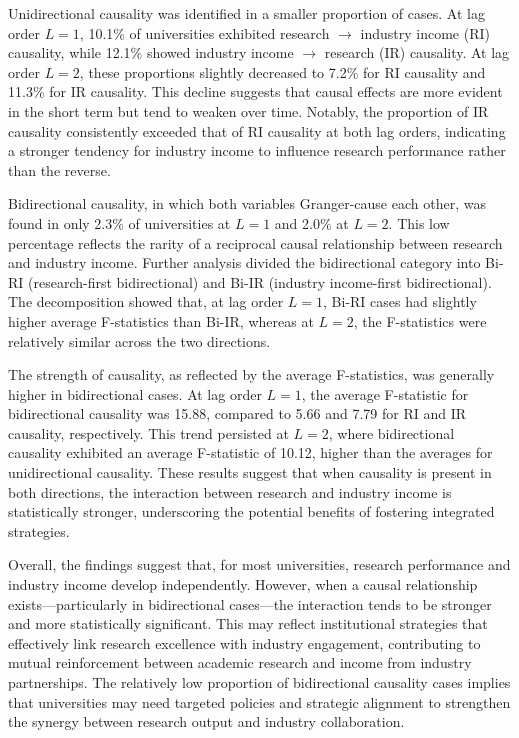 \documentclass[a4paper, conference]{IEEEtran}
\begin{document}
Unidirectional causality was identified in a smaller proportion of cases. At lag order $L=1$, 10.1\% of universities exhibited research $\rightarrow$ industry income (RI) causality, while 12.1\% showed industry income $\rightarrow$ research (IR) causality. At lag order $L=2$, these proportions slightly decreased to 7.2\% for RI causality and 11.3\% for IR causality. This decline suggests that causal effects are more evident in the short term but tend to weaken over time. Notably, the proportion of IR causality consistently exceeded that of RI causality at both lag orders, indicating a stronger tendency for industry income to influence research performance rather than the reverse.

Bidirectional causality, in which both variables Granger-cause each other, was found in only 2.3\% of universities at $L=1$ and 2.0\% at $L=2$. This low percentage reflects the rarity of a reciprocal causal relationship between research and industry income. Further analysis divided the bidirectional category into Bi-RI (research-first bidirectional) and Bi-IR (industry income-first bidirectional). The decomposition showed that, at lag order $L=1$, Bi-RI cases had slightly higher average F-statistics than Bi-IR, whereas at $L=2$, the F-statistics were relatively similar across the two directions.

The strength of causality, as reflected by the average F-statistics, was generally higher in bidirectional cases. At lag order $L=1$, the average F-statistic for bidirectional causality was 15.88, compared to 5.66 and 7.79 for RI and IR causality, respectively. This trend persisted at $L=2$, where bidirectional causality exhibited an average F-statistic of 10.12, higher than the averages for unidirectional causality. These results suggest that when causality is present in both directions, the interaction between research and industry income is statistically stronger, underscoring the potential benefits of fostering integrated strategies.

Overall, the findings suggest that, for most universities, research performance and industry income develop independently. However, when a causal relationship exists—particularly in bidirectional cases—the interaction tends to be stronger and more statistically significant. This may reflect institutional strategies that effectively link research excellence with industry engagement, contributing to mutual reinforcement between academic research and income from industry partnerships. The relatively low proportion of bidirectional causality cases implies that universities may need targeted policies and strategic alignment to strengthen the synergy between research output and industry collaboration.
\end{document}
